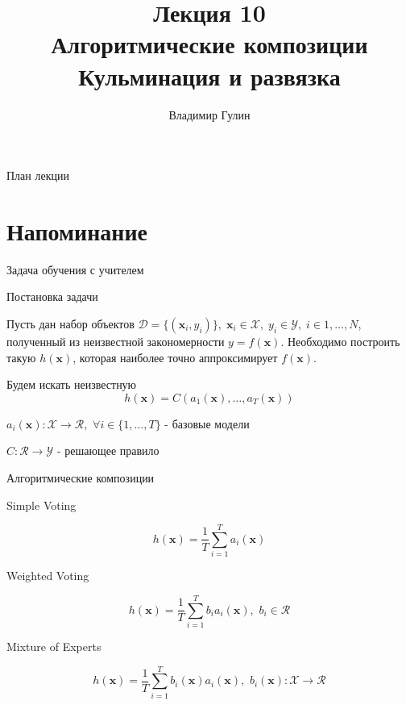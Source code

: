\documentclass[10pt]{beamer}
\author{Владимир Гулин}
\title{\newline \newline \newline Лекция 10 \\ Алгоритмические композиции\\
Кульминация и развязка}
\let\otp\titlepage
\renewcommand{\titlepage}{\otp\addtocounter{framenumber}{-1}}
\begin{document}
\begin{frame}[plain]
\titlepage
\end{frame}

\begin{frame}{План лекции}
\tableofcontents
\end{frame}

\section{Напоминание}

\begin{frame}{Задача обучения с учителем}
\begin{block}{Постановка задачи}
\end{block}

Пусть дан набор объектов $\mathcal{D} = \{(\mathbf{x}_i, y_i)\},
\; \mathbf{x}_i \in \mathcal{X},
\; y_i \in \mathcal{Y},
\; i \in 1, \ldots, N$, полученный из неизвестной закономерности $y =
f(\mathbf{x})$. Необходимо построить такую $h(\mathbf{x})$, которая наиболее точно
аппроксимирует $f(\mathbf{x})$.

\vspace{1em}
Будем искать неизвестную 
\[
    h(\mathbf{x}) = C(a_1(\mathbf{x}), \ldots, a_T(\mathbf{x}))
\]

$a_i(\mathbf{x}):\mathcal{X} \rightarrow \mathcal{R}, \,\, \forall i \in
\{1,\ldots, T\}$ - базовые модели 

$C: \mathcal{R} \rightarrow \mathcal{Y}$ - решающее правило
\end{frame}


\begin{frame}{Алгоритмические композиции}
\begin{block}{Simple Voting}
\end{block}
\[
    h(\mathbf{x}) = \frac{1}{T} \sum \limits_{i=1}^{T} a_i(\mathbf{x})
\]
\begin{block}{Weighted Voting}
\end{block}
\[
    h(\mathbf{x}) = \frac{1}{T} \sum \limits_{i=1}^{T}b_i a_i(\mathbf{x}), \,\,
    b_i \in \mathcal{R}
\]
\begin{block}{Mixture of Experts}
\end{block}
\[
    h(\mathbf{x}) = \frac{1}{T} \sum \limits_{i=1}^{T}b_i(\mathbf{x}) a_i(\mathbf{x}), \,\,
    b_i(\mathbf{x}): \mathcal{X} \rightarrow \mathcal{R}
\]
\end{frame}

\end{document}
